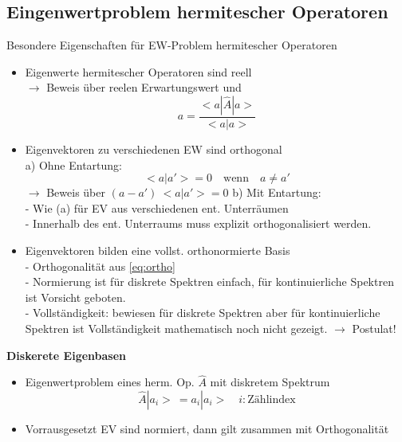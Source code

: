 \documentclass[10pt,article,colorback,accentcolor=tud9d]{scrartcl}
\begin{document}
\begin{fleqn}
\subsection{Eingenwertproblem hermitescher Operatoren}
Besondere Eigenschaften für EW-Problem hermitescher Operatoren
  \begin{itemize}
    \item Eigenwerte hermitescher Operatoren sind reell\\
      $\rightarrow$ Beweis über reelen Erwartungswert und 
      \begin{equation}
      a=\frac{<a\left.\right|\hat{A}\left.\right|a>}{<a\left.\right|a>}
      \end{equation}
    \item Eigenvektoren zu verschiedenen EW sind orthogonal\\
      a) Ohne Entartung:
         \begin{equation}
        \label{eq:ortho}
          <a\left.\right|a'> = 0 \quad \text{wenn} \quad a \neq a'
          \end{equation}
          $\rightarrow$ Beweis über $(a-a') \ <a\left.\right|a'> = 0$
      b) Mit Entartung:\\
         - Wie (a) für EV aus verschiedenen ent. Unterräumen\\
         - Innerhalb des ent. Unterraums muss explizit orthogonalisiert werden.
    \item Eigenvektoren bilden eine vollst. orthonormierte Basis\\
      - Orthogonalität aus \ref{eq:ortho}\\
      - Normierung ist für diskrete Spektren einfach, für kontinuierliche Spektren ist Vorsicht geboten.\\
      - Vollständigkeit: bewiesen für diskrete Spektren aber für kontinuierliche Spektren ist Vollständigkeit mathematisch noch nicht gezeigt. $\rightarrow$ Postulat!
  \end{itemize}
\textbf{Diskerete Eigenbasen}
\begin{itemize}
  \item Eigenwertproblem eines herm. Op. $\hat{A}$ mit diskretem Spektrum
    \begin{equation}
    \hat{A}\left.\right|a_i> \ = a_i\left.\right|a_i> \quad i:\text{Zählindex}
    \end{equation}
  \item Vorrausgesetzt EV sind normiert, dann gilt zusammen mit Orthogonalität 
    \begin{equation}

\end{equation}
\end{itemize}
\end{fleqn}
\end{document}
